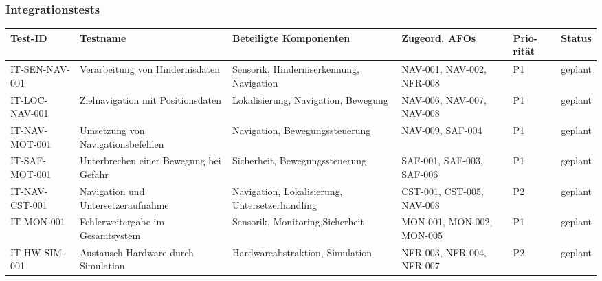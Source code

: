 \documentclass[
  a4paper,
  12pt,
  DIV=12,        %
  parskip=half,  %
  headings=small %
]{scrartcl}
\theoremstyle{definition}
\theoremstyle{definition}
\begin{document}
\newpage

\begin{landscape}
\subsubsection{Integrationstests}\label{integrationstests-2}

\begin{longtable}[]{@{}
  >{\raggedright\arraybackslash}p{}
  >{\raggedright\arraybackslash}p{}
  >{\raggedright\arraybackslash}p{}
  >{\raggedright\arraybackslash}p{}
  >{\raggedright\arraybackslash}p{}
  >{\raggedright\arraybackslash}p{}@{}}
\toprule\noalign{}
\begin{minipage}[b]{\linewidth}\raggedright
Test-ID
\end{minipage} & \begin{minipage}[b]{\linewidth}\raggedright
Testname
\end{minipage} & \begin{minipage}[b]{\linewidth}\raggedright
Beteiligte Komponenten
\end{minipage} & \begin{minipage}[b]{\linewidth}\raggedright
Zugeord. AFOs
\end{minipage} & \begin{minipage}[b]{\linewidth}\raggedright
Prio-rität
\end{minipage} & \begin{minipage}[b]{\linewidth}\raggedright
Status
\end{minipage} \\
\midrule\noalign{}
\endhead
\bottomrule\noalign{}
\endlastfoot
IT-SEN-NAV-001 & Verarbeitung von Hindernisdaten & Sensorik,
Hinderniserkennung, Navigation & NAV-001, NAV-002, NFR-008 & P1 &
geplant \\
IT-LOC-NAV-001 & Zielnavigation mit Positionsdaten & Lokalisierung,
Navigation, Bewegung & NAV-006, NAV-007, NAV-008 & P1 & geplant \\
IT-NAV-MOT-001 & Umsetzung von Navigationsbefehlen & Navigation,
Bewegungssteuerung & NAV-009, SAF-004 & P1 & geplant \\
IT-SAF-MOT-001 & Unterbrechen einer Bewegung bei Gefahr & Sicherheit,
Bewegungssteuerung & SAF-001, SAF-003, SAF-006 & P1 & geplant \\
IT-NAV-CST-001 & Navigation und Untersetzeraufnahme & Navigation,
Lokalisierung, Untersetzerhandling & CST-001, CST-005, NAV-008 & P2 &
geplant \\
IT-MON-001 & Fehlerweitergabe im Gesamtsystem & Sensorik,
Monitoring,Sicherheit & MON-001, MON-002, MON-005 & P1 & geplant \\
IT-HW-SIM-001 & Austausch Hardware durch Simulation &
Hardwareabstraktion, Simulation & NFR-003, NFR-004, NFR-007 & P2 &
geplant \\
\end{longtable}
\end{landscape}
\end{document}
